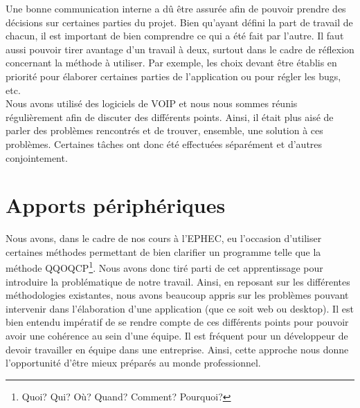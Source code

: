 Une bonne communication interne a dû être assurée afin de pouvoir prendre des décisions sur certaines parties du projet. Bien qu'ayant défini la part de travail de chacun, il est important de bien comprendre ce qui a été fait par l'autre. Il faut aussi pouvoir tirer avantage d'un travail à deux, surtout dans le cadre de réflexion concernant la méthode à utiliser. Par exemple, les choix devant être établis en priorité pour élaborer certaines parties de l'application ou pour régler les bugs, etc. \\
\newline
\indent
Nous avons utilisé des logiciels de VOIP et nous  nous sommes réunis régulièrement afin de discuter des différents points. Ainsi, il était plus aisé de parler des problèmes rencontrés et de trouver, ensemble, une solution à ces problèmes. Certaines tâches ont donc été effectuées séparément et d'autres conjointement.

\section{Apports périphériques}
Nous avons, dans le cadre de nos cours à l'EPHEC, eu l'occasion d'utiliser certaines méthodes permettant de bien clarifier un programme telle que la méthode QQOQCP\footnote{Quoi? Qui? Où? Quand? Comment? Pourquoi?}. Nous avons donc tiré parti de cet apprentissage pour introduire la problématique de notre travail. 
\newline
\indent
Ainsi, en reposant sur les différentes méthodologies existantes, nous avons beaucoup appris sur les problèmes pouvant intervenir dans l'élaboration d'une application (que ce soit web ou desktop). Il est bien entendu impératif de se rendre compte de ces différents points pour pouvoir avoir une cohérence au sein d'une équipe. Il est fréquent pour un développeur de devoir travailler en équipe dans une entreprise. Ainsi, cette approche nous donne l'opportunité d'être mieux préparés au monde professionnel.



    
%    
%
